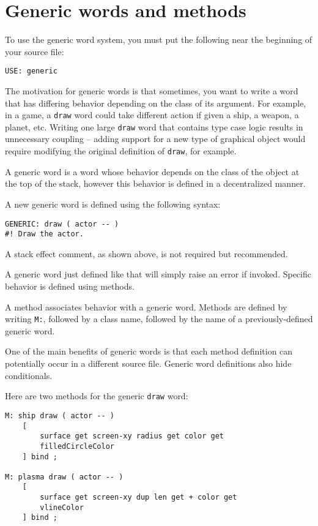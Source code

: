 \documentclass[english]{book}
\begin{document}
\section{Generic words and methods}

To use the generic word system, you must put the following near the
beginning of your source file:

\begin{verbatim}
USE: generic
\end{verbatim}

The motivation for generic words is that sometimes, you want to write a word that has
differing behavior depending on the class of its argument. For example,
in a game, a \texttt{draw} word could take different action if given a ship, a
weapon, a planet, etc. Writing one large \texttt{draw} word that contains type case logic results in
unnecessary coupling -- adding support for a new type of graphical
object would require modifying the original definition of \texttt{draw}, for
example.

A generic word is a word whose behavior depends on the class of the
object at the top of the stack, however this behavior is defined in a
decentralized manner.

A new generic word is defined using the following syntax:

\begin{verbatim}
GENERIC: draw ( actor -- )
#! Draw the actor.
\end{verbatim}

A stack effect comment, as shown above, is not required but recommended.

A generic word just defined like that will simply raise an error if
invoked. Specific behavior is defined using methods.

A method associates behavior with a generic word. Methods are defined by
writing \texttt{M:}, followed by a class name, followed by the name of a
previously-defined generic word.

One of the main benefits of generic words is that each method definition
can potentially occur in a different source file. Generic word
definitions also hide conditionals.

Here are two methods for the generic \texttt{draw} word:

\begin{verbatim}
M: ship draw ( actor -- )
    [
        surface get screen-xy radius get color get
        filledCircleColor
    ] bind ;

M: plasma draw ( actor -- )
    [
        surface get screen-xy dup len get + color get
        vlineColor
    ] bind ;
\end{verbatim}
\end{document}
